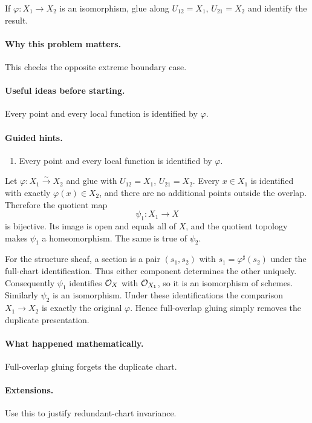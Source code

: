 \begin{problem}\label{prob:vi20-p17}
If $\varphi:X_1\to X_2$ is an isomorphism, glue along $U_{12}=X_1$, $U_{21}=X_2$ and identify the result.
\end{problem}

\ifdefined\FullProblemDossiers
\paragraph{Why this problem matters.}
This checks the opposite extreme boundary case.

\paragraph{Useful ideas before starting.}
Every point and every local function is identified by $\varphi$.

\paragraph{Guided hints.}
\begin{enumerate}
\item Every point and every local function is identified by $\varphi$.
\end{enumerate}

\begin{solution}
Let $\varphi:X_1\xrightarrow{\sim}X_2$ and glue with $U_{12}=X_1$, $U_{21}=X_2$.  Every $x\in X_1$ is identified with exactly $\varphi(x)\in X_2$, and there are no additional points outside the overlap.  Therefore the quotient map
\[
\psi_1:X_1\longrightarrow X
\]
is bijective.  Its image is open and equals all of $X$, and the quotient topology makes $\psi_1$ a homeomorphism.  The same is true of $\psi_2$.

For the structure sheaf, a section is a pair $(s_1,s_2)$ with $s_1=\varphi^\sharp(s_2)$ under the full-chart identification.  Thus either component determines the other uniquely.  Consequently $\psi_1$ identifies $\mathcal O_X$ with $\mathcal O_{X_1}$, so it is an isomorphism of schemes.  Similarly $\psi_2$ is an isomorphism.  Under these identifications the comparison $X_1\to X_2$ is exactly the original $\varphi$.  Hence full-overlap gluing simply removes the duplicate presentation.
\end{solution}


\paragraph{What happened mathematically.}
Full-overlap gluing forgets the duplicate chart.

\paragraph{Extensions.}
Use this to justify redundant-chart invariance.
\fi
